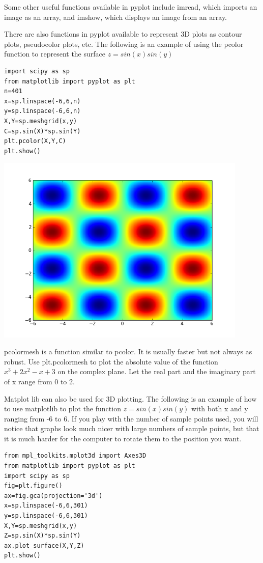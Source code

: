 Some other useful functions available in pyplot include imread, which imports an image as an array, and imshow, which displays an image from an array.

There are also functions in pyplot available to represent 3D plots as contour plots, pseudocolor plots, etc.
The following is an example of using the pcolor function to represent the surface $z=sin(x)sin(y)$
\begin{lstlisting}
import scipy as sp
from matplotlib import pyplot as plt
n=401
x=sp.linspace(-6,6,n)
y=sp.linspace(-6,6,n)
X,Y=sp.meshgrid(x,y)
C=sp.sin(X)*sp.sin(Y)
plt.pcolor(X,Y,C)
plt.show()
\end{lstlisting}

\includegraphics[width=120mm]{pcolor.png}

\begin{problem}
pcolormesh is a function similar to pcolor. It is usually faster but not always as robust.
Use plt.pcolormesh to plot the absolute value of the function $x^3 +2x^2 -x +3$ on the complex plane. Let the real part and the imaginary part of x range from 0 to 2.
\end{problem}

Matplot lib can also be used for 3D plotting. The following is an example of how to use matplotlib to plot the function $z=sin(x)sin(y)$ with both x and y ranging from -6 to 6. If you play with the number of sample points used, you will notice that graphs look much nicer with large numbers of sample points, but that it is much harder for the computer to rotate them to the position you want.

\begin{lstlisting}
from mpl_toolkits.mplot3d import Axes3D
from matplotlib import pyplot as plt
import scipy as sp
fig=plt.figure()
ax=fig.gca(projection='3d')
x=sp.linspace(-6,6,301)
y=sp.linspace(-6,6,301)
X,Y=sp.meshgrid(x,y)
Z=sp.sin(X)*sp.sin(Y)
ax.plot_surface(X,Y,Z)
plt.show()
\end{lstlisting}

